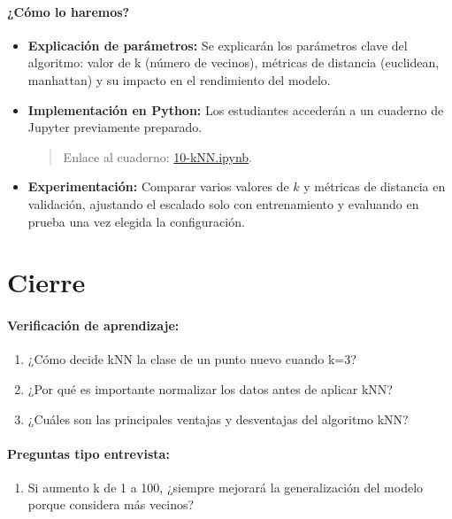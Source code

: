 \documentclass[a4,11pt]{aleph-notas}
\begin{document}
\paragraph{¿Cómo lo haremos?}  
\begin{itemize}[leftmargin=*]
    \item \textbf{Explicación de parámetros:}  
    Se explicarán los parámetros clave del algoritmo: valor de k (número de vecinos), métricas de distancia (euclidean, manhattan) y su impacto en el rendimiento del modelo.
    
    \item \textbf{Implementación en Python:} Los estudiantes accederán a un cuaderno de Jupyter previamente preparado.
    \begin{quote}
        Enlace al cuaderno: \href{https://github.com/andres-merino/AprendizajeAutomaticoInicial-05-N0105/blob/main/2-Notebooks/10-kNN.ipynb}{10-kNN.ipynb}.
    \end{quote}
    
    \item \textbf{Experimentación:} Comparar varios valores de $k$ y métricas de distancia en validación, ajustando el escalado solo con entrenamiento y evaluando en prueba una vez elegida la configuración.
    
\end{itemize}

\section*{Cierre}

\paragraph{Verificación de aprendizaje:} 
\begin{enumerate}[leftmargin=*]
    \item ¿Cómo decide kNN la clase de un punto nuevo cuando k=3?
    
    \item ¿Por qué es importante normalizar los datos antes de aplicar kNN?
    
    \item ¿Cuáles son las principales ventajas y desventajas del algoritmo kNN?
\end{enumerate}

\paragraph{Preguntas tipo entrevista:} 
\begin{enumerate}[leftmargin=*]  
    \item Si aumento k de 1 a 100, ¿siempre mejorará la generalización del modelo porque considera más vecinos?
\end{enumerate}
\end{document}
